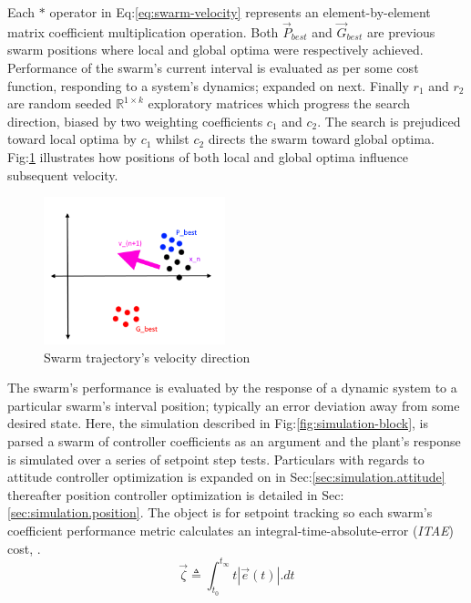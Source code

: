 Each $\ast$ operator in Eq:\ref{eq:swarm-velocity} represents an element-by-element matrix coefficient multiplication operation. Both $\vec{P}_{best}$ and $\vec{G}_{best}$ are previous swarm positions where local and global optima were respectively achieved. Performance of the swarm's current interval is evaluated as per some cost function, responding to a system's dynamics; expanded on next. Finally $r_1$ and $r_2$ are random seeded $\mathbb{R}^{1\times k}$ exploratory matrices which progress the search direction, biased by two weighting coefficients $c_1$ and $c_2$. The search is prejudiced toward local optima by $c_1$ whilst $c_2$ directs the swarm toward global optima. Fig:\ref{fig:swarm-trajectory} illustrates how positions of both local and global optima influence subsequent velocity.
\begin{figure}[hbtp]
\vspace{-12pt}
\centering
\includegraphics[width=0.47\textwidth]{figs/swarm-trajectory}
\vspace{-12pt}
\caption{Swarm trajectory's velocity direction}
\label{fig:swarm-trajectory}
\end{figure}
\par
The swarm's performance is evaluated by the response of a dynamic system to a particular swarm's interval position; typically an error deviation away from some desired state. Here, the simulation described in Fig:\ref{fig:simulation-block}, is parsed a swarm of controller coefficients as an argument and the plant's response is simulated over a series of setpoint step tests. Particulars with regards to attitude controller optimization is expanded on in Sec:\ref{sec:simulation.attitude} thereafter position controller optimization is detailed in Sec:\ref{sec:simulation.position}. The object is for setpoint tracking so each swarm's coefficient performance metric calculates an integral-time-absolute-error (\emph{ITAE}) cost, \cite{ITAE}.
\begin{equation}
\vec{\zeta}\triangleq\int_{t_0}^{t_\infty}t|\vec{e}(t)|.dt
\end{equation}

